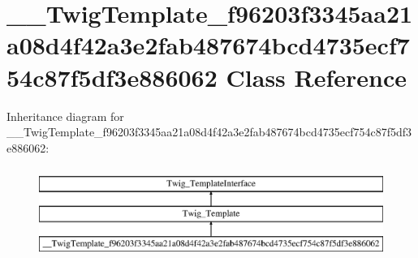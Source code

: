 \hypertarget{class_____twig_template__f96203f3345aa21a08d4f42a3e2fab487674bcd4735ecf754c87f5df3e886062}{}\section{\+\_\+\+\_\+\+Twig\+Template\+\_\+f96203f3345aa21a08d4f42a3e2fab487674bcd4735ecf754c87f5df3e886062 Class Reference}
\label{class_____twig_template__f96203f3345aa21a08d4f42a3e2fab487674bcd4735ecf754c87f5df3e886062}
Inheritance diagram for \+\_\+\+\_\+\+Twig\+Template\+\_\+f96203f3345aa21a08d4f42a3e2fab487674bcd4735ecf754c87f5df3e886062\+:\begin{figure}[H]
\begin{center}
\leavevmode
\includegraphics[height=3.000000cm]{class_____twig_template__f96203f3345aa21a08d4f42a3e2fab487674bcd4735ecf754c87f5df3e886062}
\end{center}
\end{figure}
